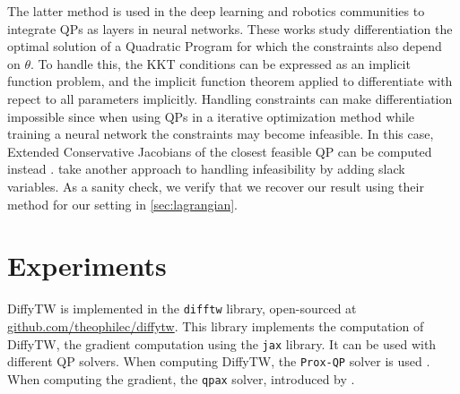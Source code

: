 The latter method is used in the deep learning and robotics communities to integrate QPs as layers in neural networks\citep{QP-Layer,optnet}. These works study differentiation the optimal solution of a Quadratic Program for which the constraints also depend on $\theta$. To handle this, the KKT conditions can be expressed as an implicit function problem, and the implicit function theorem applied to differentiate with repect to all parameters implicitly. Handling constraints can make differentiation impossible since when using QPs in a iterative optimization method while training a neural network the constraints may become infeasible. In this case, Extended Conservative Jacobians of the closest feasible QP can be computed instead \citep{QP-Layer}. \citet{optnet} take another approach to handling infeasibility by adding slack variables. As a sanity check, we verify that we recover our result using their method for our setting in \cref{sec:lagrangian}.

\section{Experiments}
DiffyTW is implemented in the \texttt{difftw} library, open-sourced at \url{github.com/theophilec/diffytw}. This library implements the computation of DiffyTW, the gradient computation using the \texttt{jax} library. It can be used with different QP solvers. When computing DiffyTW, the \texttt{Prox-QP} solver is used \cite{fabian}. When computing the gradient, the \texttt{qpax} solver, introduced by \citet{qpax}.




